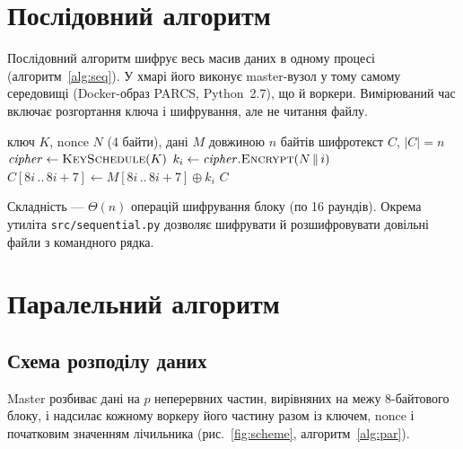 \documentclass[a4paper,12pt]{article}
\begin{document}
\section{Послідовний алгоритм}
Послідовний алгоритм шифрує весь масив даних в одному процесі (алгоритм~\ref{alg:seq}).
У хмарі його виконує master-вузол у тому самому середовищі (Docker-образ PARCS,
Python~2.7), що й воркери. Вимірюваний час включає розгортання ключа і
шифрування, але не читання файлу.

\begin{algorithm}[H]
  \caption{Послідовне шифрування Blowfish-CTR}\label{alg:seq}
  \begin{algorithmic}[1]
    \Require ключ $K$, nonce $N$ (4 байти), дані $M$ довжиною $n$ байтів
    \Ensure шифротекст $C$, $|C| = n$
    \State $\mathit{cipher} \gets \textsc{KeySchedule}(K)$ 
      \State $k_i \gets \mathit{cipher}.\textsc{Encrypt}(N \,\|\, i)$ 
      \State $C[8i \,..\, 8i+7] \gets M[8i \,..\, 8i+7] \oplus k_i$ 
    \EndFor
    \State \Return $C$
  \end{algorithmic}
\end{algorithm}

Складність --- $\Theta(n)$ операцій шифрування блоку (по 16 раундів).
Окрема утиліта \texttt{src/sequential.py} дозволяє шифрувати й розшифровувати
довільні файли з командного рядка.

\section{Паралельний алгоритм}
\subsection{Схема розподілу даних}
Master розбиває дані на $p$ неперервних частин, вирівняних на межу 8-байтового блоку,
і надсилає кожному воркеру його частину разом із ключем, nonce і початковим
значенням лічильника (рис.~\ref{fig:scheme}, алгоритм~\ref{alg:par}).
\end{document}
